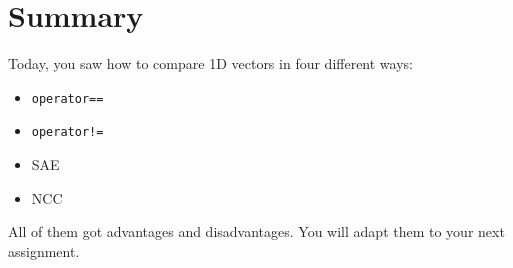 \documentclass[english,a4paper,12pt,oneside]{article}
\begin{document}
\section*{Summary}

Today, you saw how to compare 1D vectors in four different ways:
\begin{itemize}
\item \verb+operator==+
\item \verb+operator!=+
\item SAE
\item NCC
\end{itemize}
All of them got advantages and disadvantages. 
You will adapt them to your next assignment.



%
%
%
%
%
%
%
%
%
%
\end{document}
